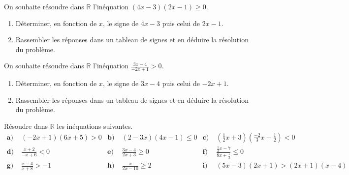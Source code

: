 \documentclass[11pt]{article}
\begin{document}
\begin{exo}
On souhaite résoudre dans $\mathbb{R}$ l'inéquation
$(4x-3)(2x-1)\geq0$.
\begin{enumerate}
  \item Déterminer, en fonction de $x$, le signe de $4x-3$ puis celui de $2x-1$.
  \item Rassembler les réponses dans un tableau de signes et en déduire la
    résolution du problème.
\end{enumerate}
\end{exo}

\begin{exo}
On souhaite résoudre dans $\mathbb{R}$ l'inéquation
$\frac{3x-4}{-2x+1}>0$.
\begin{enumerate}
  \item Déterminer, en fonction de $x$, le signe de $3x-4$ puis celui de $-2x+1$.
  \item Rassembler les réponses dans un tableau de signes et en déduire la
    résolution du problème.
\end{enumerate}
\end{exo}

\begin{exo}
Résoudre dans $\mathbb{R}$ les inéquations suivantes.
\begin{align*}
  \textbf{a)}\;& (-2x+1)(6x+5)>0 &
  \textbf{b)}\;& (2-3x)(4x-1)\leq0 &
  \textbf{c)}\;&
  \left(\frac{1}{2}x+3\right)\left(\frac{-2}{3}x-\frac{1}{2}\right)<0 \\
  \textbf{d)}\;& \frac{x+2}{-x+6}<0 &
  \textbf{e)}\;& \frac{3x-4}{2x+3} \geq 0 &
  \textbf{f)}\;& \frac{\frac{1}{2}x-7}{8x+\frac{1}{3}} \leq0 \\
  \textbf{g)}\;& \frac{x-4}{x+8} > -1 &
  \textbf{h)}\;& \frac{x}{2x-10}\geq 2 &
  \textbf{i)}\;& (5x-3)(2x+1) > (2x+1)(x-4)
\end{align*}
\end{exo}
\end{document}
